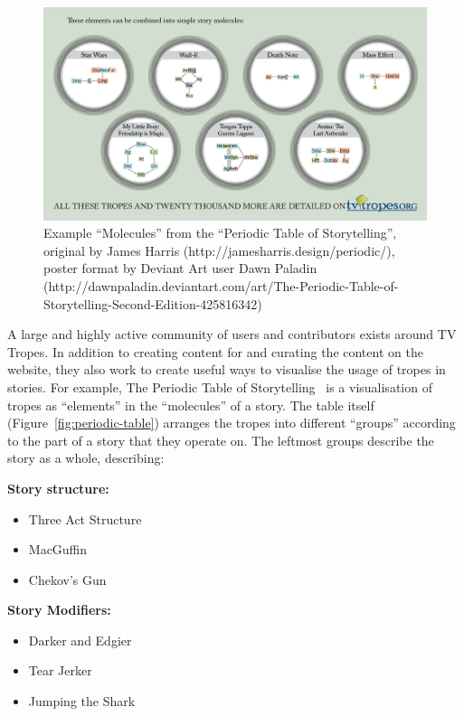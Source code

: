 \documentclass[11pt]{report}
\begin{document}
\begin{figure}[t!]
\centerline{\includegraphics[width=\textwidth]{periodicExamples.png}}
\caption{Example ``Molecules'' from the ``Periodic Table of Storytelling'', original by James Harris
  (http://jamesharris.design/periodic/), poster format by Deviant Art user Dawn
  Paladin (http://dawnpaladin.deviantart.com/art/The-Periodic-Table-of-Storytelling-Second-Edition-425816342)} \label{fig:periodic-examples}
\end{figure}

A large and highly active community of users and contributors exists around TV
Tropes. In addition to creating content for and curating the content on the
website, they also work to create useful ways to visualise the usage of tropes
in stories. For example, The Periodic Table of
Storytelling~\citep{periodicTableOfStorytelling} is a visualisation of tropes as
``elements'' in the ``molecules'' of a story. The table itself
(Figure~\ref{fig:periodic-table}) arranges the tropes into different ``groups''
according to the part of a story that they operate on. The leftmost groups
describe the story as a whole, describing:

\textbf{Story structure:}
\begin{itemize}
  \item Three Act Structure
  \item MacGuffin
  \item Chekov's Gun
\end{itemize}

\textbf{Story Modifiers:}
\begin{itemize}
  \item Darker and Edgier
  \item Tear Jerker
  \item Jumping the Shark
\end{itemize}
\end{document}
